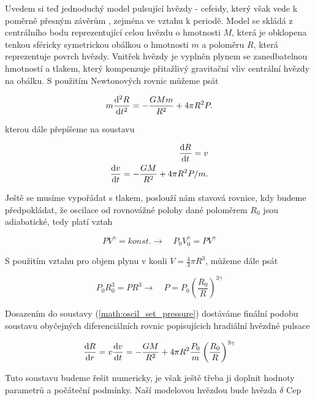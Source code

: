 Uvedem si teď jednoduchý model pulsující hvězdy - cefeidy, který však vede k poměrně 
přesným závěrům , zejména ve vztahu k periodě. Model se skládá z centrálního bodu reprezentující celou hvězdu o hmotnosti 
$M$, která je obklopena tenkou sféricky symetrickou obálkou o hmotnosti $m$ a poloměru $R$, která reprezentuje povrch hvězdy.
Vnitřek hvězdy je vyplněn plynem se zanedbatelnou hmotností a tlakem, který kompenzuje přitažlivý gravitační vliv centrální hvězdy na obálku. S použitím Newtonových rovnic můžeme psát

\begin{equation}
m\frac{{\rm d}^2 R}{{\rm d} t^2} = -\frac{GMm}{R^2}+4\pi R^2 P.
\end{equation}

kterou dále přepíšeme na soustavu

\begin{eqnarray}
\label{math:oscil_set_pressure}
\frac{{\rm d}R}{{\rm d}t} = v \\
\frac{{\rm d}v}{{\rm d}t} = -\frac{GM}{R^2} + 4\pi R^2 P/m.
\end{eqnarray}

Ještě se musíme vypořádat s tlakem, poslouží nám stavová rovnice, kdy budeme předpokládat, že oscilace od rovnovážné polohy dané poloměrem $R_0$ jsou adiabatické, tedy platí vztah

\begin{equation}
PV^{\gamma} = konst. \rightarrow {\quad} P_0 V_0^{\gamma} = P V^{\gamma}
\end{equation}

S použitím vztahu pro objem plynu v kouli $V = \frac{4}{3}\pi R^3$, můžeme dále psát

\begin{equation}
P_0 R_0^3 = P R^3 \rightarrow {\quad} P = P_0 \left(\frac{R_0}{R}\right)^{3\gamma}
\end{equation}

Dosazením do soustavy (\ref{math:oscil_set_pressure}) dostáváme finální podobu soustavu obyčejných diferenciálních rovnic popisujícich hradiální hvězdné pulsace

\begin{equation}
\label{math:oscil_final_set}
\frac{{\rm d}R}{{\rm d}r} = v \\
\frac{{\rm d}v}{{\rm d}t} = -\frac{GM}{R^2}+4\pi R^2 \frac{P_0}{m} \left(\frac{R_0}{R}\right)^{3\gamma}
\end{equation}

Tuto soustavu budeme řešit numericky, je však ještě třeba ji doplnit hodnoty parametrů a počáteční podmínky. Naší modelovou hvězdou bude hvězda 
$\delta$ Cep
